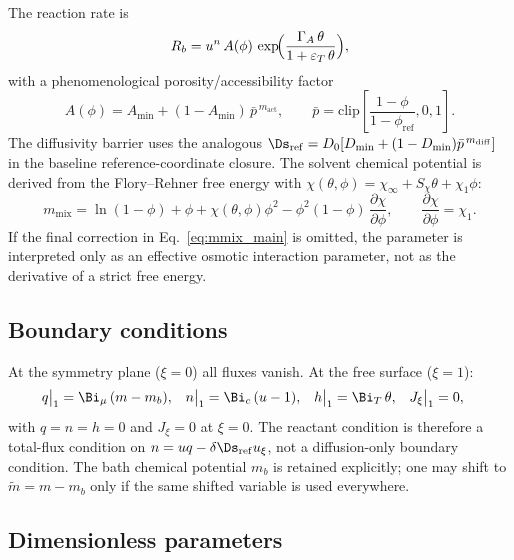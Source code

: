 The reaction rate is
\begin{equation}
  R_b = u^n\,A(\phi)\,
  \exp\!\Bigl(\frac{\Gamma_A\,\theta}{1+\varepsilon_T\,\theta}\Bigr),
  \label{eq:rxn}
\end{equation}
with a phenomenological porosity/accessibility factor
\begin{equation}
  A(\phi)=A_\mathrm{min}+(1-A_\mathrm{min})\,
  \bar p^{\,m_\mathrm{act}}, \qquad
  \bar p=\mathrm{clip}\!\left[
    \frac{1-\phi}{1-\phi_\mathrm{ref}},0,1\right].
  \label{eq:accessibility}
\end{equation}
The diffusivity barrier uses the analogous
$\Ds_\mathrm{ref}=D_0[D_\mathrm{min}+(1-D_\mathrm{min})
\bar p^{\,m_\mathrm{diff}}]$ in the baseline reference-coordinate
closure.  The solvent chemical potential is derived from the
Flory--Rehner free energy with
$\chi(\theta,\phi)=\chi_\infty+S_\chi\theta+\chi_1\phi$:
\begin{equation}
  m_\mathrm{mix}
  =\ln(1-\phi)+\phi+\chi(\theta,\phi)\phi^2
  -\phi^2(1-\phi)\,\frac{\partial\chi}{\partial\phi},
  \qquad \frac{\partial\chi}{\partial\phi}=\chi_1.
  \label{eq:mmix_main}
\end{equation}
If the final correction in Eq.~\eqref{eq:mmix_main} is omitted, the
parameter is interpreted only as an effective osmotic interaction
parameter, not as the derivative of a strict free energy.

\subsection{Boundary conditions}

At the symmetry plane ($\xi=0$) all fluxes vanish. At the free
surface ($\xi=1$):
\begin{align}
  q\big|_1&=\Bi_\mu\,(m-m_b), &
  n\big|_1&=\Bi_c\,(u-1), &
  h\big|_1&=\Bi_T\,\theta, &
  J_\xi\big|_1&=0,
  \label{eq:bc}
\end{align}
with $q=n=h=0$ and $J_\xi=0$ at $\xi=0$.  The reactant condition is
therefore a total-flux condition on
$n=u q-\delta\Ds_\mathrm{ref}u_\xi$, not a diffusion-only boundary
condition.  The bath chemical potential $m_b$ is retained explicitly;
one may shift to $\tilde m=m-m_b$ only if the same shifted variable is
used everywhere.

\subsection{Dimensionless parameters}

